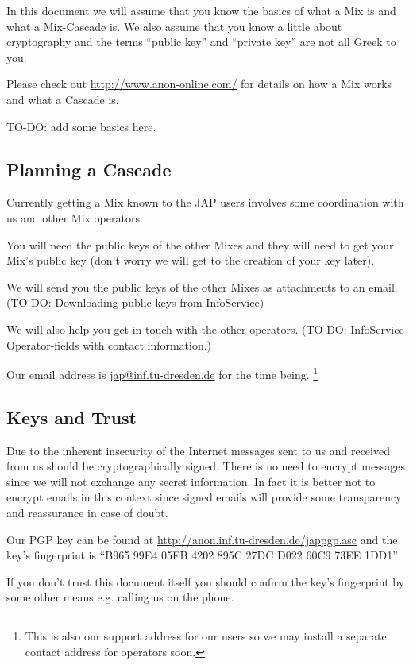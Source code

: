 \documentclass{article}
\begin{document}
In this document we will assume that you know the basics of what a Mix
is and what a Mix-Cascade is. We also assume that you know a little
about cryptography and the terms ``public key'' and ``private key''
are not all Greek to you.

Please check out \url{http://www.anon-online.com/} for details on how
a Mix works and what a Cascade is.

TO-DO: add some basics here.


\subsection{Planning a Cascade}

Currently getting a Mix known to the JAP users involves some
coordination with us and other Mix operators.

You will need the public keys of the other Mixes and they will need to
get your Mix's public key (don't worry we will get to the creation of
your key later).

We will send you the public keys of the other Mixes as attachments
to an email. (TO-DO: Downloading public keys from InfoService)

We will also help you get in touch with the other operators.
(TO-DO: InfoService Operator-fields with contact information.)

Our email address is \url{jap@inf.tu-dresden.de} for the time being.
\footnote{This is also our support address for our users so we may install a
separate contact address for operators soon.}

\subsection{Keys and Trust}

Due to the inherent insecurity of the Internet messages sent to us and
received from us should be cryptographically signed. There is no need to
encrypt messages since we will not exchange any secret information. In
fact it is better not to encrypt emails in this context since signed
emails will provide some transparency and reassurance in case of doubt.

Our PGP key can be found at \url{http://anon.inf.tu-dresden.de/jappgp.asc}
and the key's fingerprint is ``B965 99E4 05EB 4202 895C 27DC D022 60C9 73EE 1DD1''

If you don't trust this document itself you should confirm the key's
fingerprint by some other means e.g. calling us on the phone.
\end{document}
